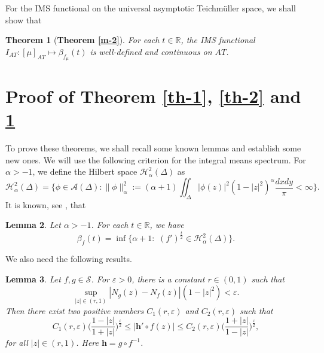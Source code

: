 \documentclass[11pt]{amsart}
\newtheorem{theorem}{Theorem}[section]
\newtheorem{lemma}[theorem]{Lemma}
\theoremstyle{remark}
\newtheorem{remark}[theorem]{Remark}
\theoremstyle{claim}
\theoremstyle{definition}
\theoremstyle{problem}
\theoremstyle{conjecture}
\theoremstyle{question}
\numberwithin{equation}{section}
\begin{document}
For the IMS functional on the universal asymptotic Teichm\"uller space,  we shall show that
\begin{theorem}[{\bf Theorem \ref{m-2}}]\label{th-3}
For each $t\in \mathbb{R}$, the IMS functional $I_{{AT}}: [\mu]_{AT} \mapsto  \beta_{f_\mu}(t)$ is well-defined and continuous on $AT$.
\end{theorem}

\section{\bf {Proof of Theorem \ref{th-1}, \ref{th-2} and \ref{th-3}} }
To prove these theorems, we shall recall some known lemmas and establish some new ones. We will use the following criterion for the integral means spectrum.  For $\alpha>-1$, we define the Hilbert space $\mathcal{H}_{\alpha}^2(\Delta)$ as
$$\mathcal{H}_{\alpha}^2(\Delta)=\{\phi \in \mathcal{A}(\Delta) : \|\phi\|_{\alpha}^2:=(\alpha+1)\iint_{\Delta}|\phi (z)|^2(1-|z|^2)^{\alpha}\frac{dxdy}{\pi}<\infty\}.$$
It is known,  see \cite{HS-1},  that

\begin{lemma}\label{cri} Let $\alpha>-1$.  For each $t\in \mathbb{R}$, we have
$$\beta_{f}(t)=\inf\{ \alpha+1: \,\,(f')^{\frac{t}{2}}\in \mathcal{H}_{\alpha}^2(\Delta)\}.$$
\end{lemma}

We also need the following results.
\begin{lemma}\label{key-est}
Let $f, g \in \mathcal{S}$.  For $\varepsilon>0$, there is a constant $r\in (0, 1) $ such that
\begin{equation}\label{condition}\sup\limits_{|z|\in (r, 1)}|N_g(z)-N_f(z)|(1-|z|^2) <\varepsilon. \end{equation}
Then there exist two positive numbers $C_1(r, \varepsilon)$ and $C_2(r,\varepsilon)$ such that
\begin{equation}
C_1(r, \varepsilon)\Big( \frac{1-|z|}{1+|z|}\Big)^{\frac{\varepsilon}{2}}\leq |{\mathbf{h}}' \circ f(z)| \leq  C_2(r, \varepsilon) \Big( \frac{1+|z|}{1-|z|}\Big)^{\frac{\varepsilon}{2}},\nonumber
\end{equation}
for all $|z|\in (r,1)$.  Here $\mathbf{h}=g \circ f^{-1}$.\end{lemma}
\end{document}
